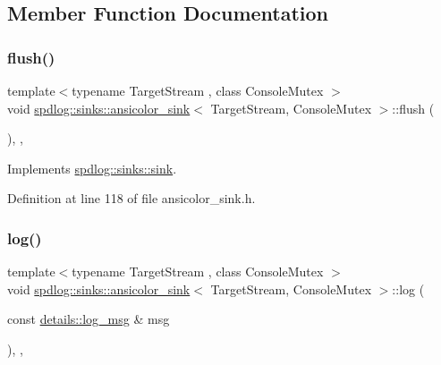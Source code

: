 \subsection{Member Function Documentation}
\mbox{\label{classspdlog_1_1sinks_1_1ansicolor__sink_a3c0587e868d2a42f96b878c6031333a0}} 
\subsubsection{\texorpdfstring{flush()}{flush()}}
{\footnotesize\ttfamily template$<$typename Target\+Stream , class Console\+Mutex $>$ \\
void \hyperlink{classspdlog_1_1sinks_1_1ansicolor__sink}{spdlog\+::sinks\+::ansicolor\+\_\+sink}$<$ Target\+Stream, Console\+Mutex $>$\+::flush (\begin{DoxyParamCaption}{ }\end{DoxyParamCaption})\hspace{0.3cm}{\ttfamily [inline]}, {\ttfamily [override]}, {\ttfamily [virtual]}}



Implements \hyperlink{classspdlog_1_1sinks_1_1sink_a8a0674ae3bca8f1617aef820e23a2ccd}{spdlog\+::sinks\+::sink}.



Definition at line 118 of file ansicolor\+\_\+sink.\+h.

\mbox{\label{classspdlog_1_1sinks_1_1ansicolor__sink_a042a6ab886430570095737e1984e7c6e}} 
\subsubsection{\texorpdfstring{log()}{log()}}
{\footnotesize\ttfamily template$<$typename Target\+Stream , class Console\+Mutex $>$ \\
void \hyperlink{classspdlog_1_1sinks_1_1ansicolor__sink}{spdlog\+::sinks\+::ansicolor\+\_\+sink}$<$ Target\+Stream, Console\+Mutex $>$\+::log (\begin{DoxyParamCaption}\item[{const \hyperlink{structspdlog_1_1details_1_1log__msg}{details\+::log\+\_\+msg} \&}]{msg }\end{DoxyParamCaption})\hspace{0.3cm}{\ttfamily [inline]}, {\ttfamily [override]}, {\ttfamily [virtual]}}



